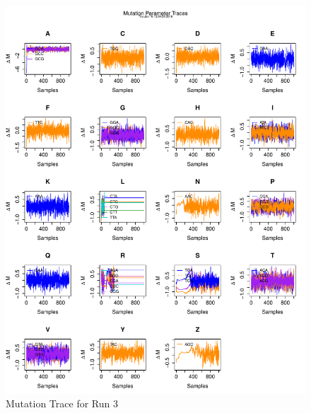 \documentclass[11pt]{labbook}
\begin{document}
\begin{itemize}
\begin{figure}
            \includegraphics[scale=.65]{FONSE_Plots/2016/June_16/Run3_MutationTrace}
            \caption{Mutation Trace for Run 3}
            \label{fig:JUN16_MUT_R3}
        \end{figure}
        \begin{figure}
            \centering

\end{figure}
\end{itemize}
\end{document}
